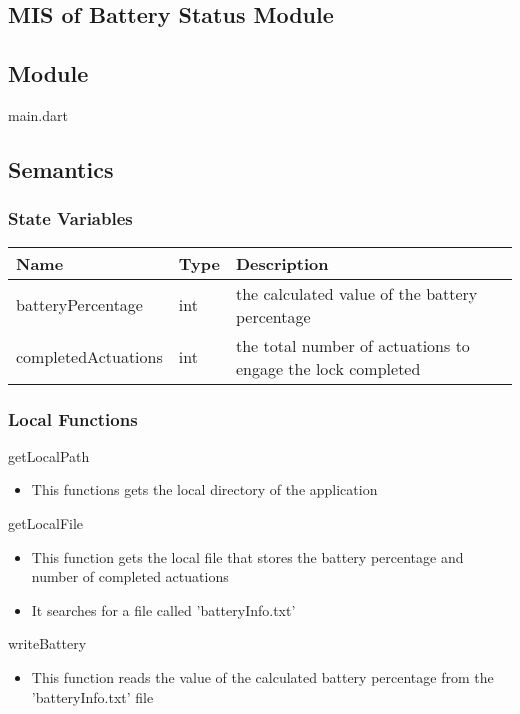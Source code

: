 \documentclass[12pt, titlepage]{article}
\begin{document}
\begin{itemize}
\section{MIS of Battery Status Module} \label{mHD}

\subsection{Module}
main.dart

\subsection{Semantics}

\subsubsection{State Variables}

\begin{center}
\begin{tabular}{p{4cm} p{4cm} p{6cm}}
\hline
\textbf{Name} & \textbf{Type} & \textbf{Description} \\
\hline
batteryPercentage & int & the calculated value of the battery percentage \\
completedActuations & int & the total number of actuations to engage the lock completed \\
\hline
\end{tabular}
\end{center}

\subsubsection{Local Functions}

\noindent getLocalPath
\begin{itemize}
\item This functions gets the local directory of the application
\end{itemize}

\noindent getLocalFile
\begin{itemize}
\item This function gets the local file that stores the battery percentage and number of completed actuations 
\item It searches for a file called 'batteryInfo.txt'
\end{itemize}

\noindent writeBattery
\begin{itemize}
\item This function reads the value of the calculated battery percentage from the 'batteryInfo.txt' file
\end{itemize}


\end{itemize}
\end{document}
